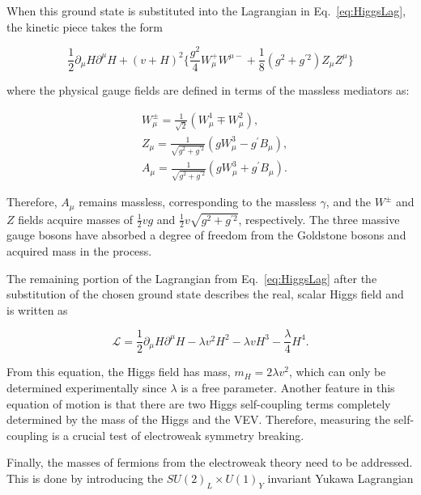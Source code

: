 \noindent
When this ground state is substituted into the Lagrangian in Eq.~\ref{eq:HiggsLag}, the kinetic piece takes the form

\begin{equation}
\frac{1}{2}\partial_{\mu}H\partial^{\mu}H+(v + H)^{2}\Big\{\frac{g^{2}}{4}W_{\mu}^{+}W^{\mu-}+\frac{1}{8}(g^{2}+g^{\prime 2})Z_{\mu}Z^{\mu}\Big\}
\end{equation}

\noindent
where the physical gauge fields are defined in terms of the massless mediators as:

\begin{align}
&W^{\pm}_{\mu}=\frac{1}{\sqrt{2}}(W^{1}_{\mu}\mp W^{2}_{\mu}),
\\
&Z_{\mu}=\frac{1}{\sqrt{g^{2}+g^{\prime2}}}(gW_{\mu}^{3}-g^{\prime}B_{\mu}),
\\
&A_{\mu}=\frac{1}{\sqrt{g^{2}+g^{\prime2}}}(gW_{\mu}^{3}+g^{\prime}B_{\mu}).
\end{align}

\noindent
Therefore, $A_{\mu}$ remains massless, corresponding to the massless $\gamma$, and the $W^{\pm}$ and $Z$ fields acquire masses of $\frac{1}{2}v g$ and $\frac{1}{2}v\sqrt{g^{2}+g^{\prime 2}}$, respectively. The three massive gauge bosons have absorbed a degree of freedom from the Goldstone bosons and acquired mass in the process.

The remaining portion of the Lagrangian from Eq.~\ref{eq:HiggsLag} after the substitution of the chosen ground state describes the real, scalar Higgs field and is written as

\begin{equation}
\label{eq:HiggsLag}
\mathcal{L}=\frac{1}{2}\partial_{\mu}H\partial^{\mu}H -\lambda v^{2}H^{2}-\lambda v H^{3}-\frac{\lambda}{4}H^{4}.
\end{equation}

\noindent
From this equation, the Higgs field has mass, $m_{H}=2\lambda v^{2}$, which can only be determined experimentally since $\lambda$ is a free parameter. Another feature in this equation of motion is that there are two Higgs self-coupling terms completely determined by the mass of the Higgs and the VEV. Therefore, measuring the self-coupling is a crucial test of electroweak symmetry breaking.

Finally, the masses of fermions from the electroweak theory need to be addressed. This is done by introducing the $SU(2)_{L}\times U(1)_{Y}$ invariant Yukawa Lagrangian

